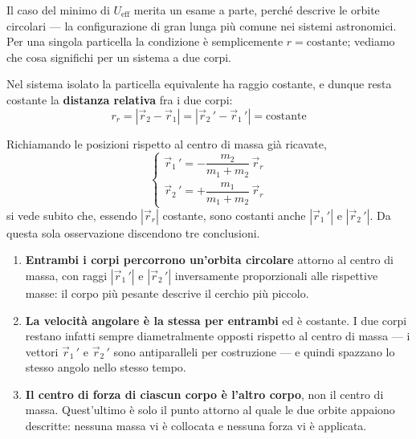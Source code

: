 Il caso del minimo di $U_{\text{eff}}$ merita un esame a parte, perché descrive le orbite circolari --- la configurazione di gran lunga più comune nei sistemi astronomici. Per una singola particella la condizione è semplicemente $r = \text{costante}$; vediamo che cosa significhi per un sistema a due corpi.

Nel sistema isolato la particella equivalente ha raggio costante, e dunque resta costante la \textbf{distanza relativa} fra i due corpi:
\begin{equation}
    r_r = |\vec{r}_2 - \vec{r}_1| = |\vec{r}_2\,' - \vec{r}_1\,'| = \text{costante}
\end{equation}

Richiamando le posizioni rispetto al centro di massa già ricavate,
\begin{equation}
    \begin{cases}
        \vec{r}_1\,' = - \dfrac{m_2}{m_1+m_2}\,\vec{r}_r \\[8pt]
        \vec{r}_2\,' = + \dfrac{m_1}{m_1+m_2}\,\vec{r}_r
    \end{cases}
\end{equation}
si vede subito che, essendo $|\vec{r}_r|$ costante, sono costanti anche $|\vec{r}_1\,'|$ e $|\vec{r}_2\,'|$. Da questa sola osservazione discendono tre conclusioni.

\begin{enumerate}
    \item \textbf{Entrambi i corpi percorrono un'orbita circolare} attorno al centro di massa, con raggi $|\vec{r}_1\,'|$ e $|\vec{r}_2\,'|$ inversamente proporzionali alle rispettive masse: il corpo più pesante descrive il cerchio più piccolo.
    \item \textbf{La velocità angolare è la stessa per entrambi} ed è costante. I due corpi restano infatti sempre diametralmente opposti rispetto al centro di massa --- i vettori $\vec{r}_1\,'$ e $\vec{r}_2\,'$ sono antiparalleli per costruzione --- e quindi spazzano lo stesso angolo nello stesso tempo.
    \item \textbf{Il centro di forza di ciascun corpo è l'altro corpo}, non il centro di massa. Quest'ultimo è solo il punto attorno al quale le due orbite appaiono descritte: nessuna massa vi è collocata e nessuna forza vi è applicata.
\end{enumerate}

